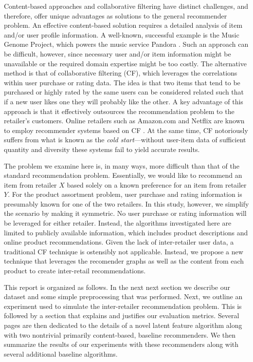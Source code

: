 \documentclass[11pt]{article}
\begin{document}
Content-based approaches and collaborative filtering have distinct challenges,
and therefore, offer unique advantages as solutions to the general recommender
problem.  An effective content-based solution requires a detailed analysis of
item and/or user profile information. A well-known, successful example is the
Music Genome Project, which powers the music service Pandora \cite{mgp}. Such an
approach can be difficult, however, since necessary user and/or item information
might be unavailable or the required domain expertise might be too costly. The
alternative method is that of collaborative filtering (CF), which leverages the
correlations within user purchase or rating data. The idea is that two items
that tend to be purchased or highly rated by the same users can be considered
related such that if a new user likes one they will probably like the other. A
key advantage of this approach is that it effectively outsources the
recommendation problem to the retailer's customers. Online retailers such as
Amazon.com and Netflix are known to employ recommender systems based on CF
\cite{Koren2009}. At the same time, CF notoriously suffers from what is known as
the {\em cold start}---without user-item data of sufficient quantity and
diversity these systems fail to yield accurate results.

The problem we examine here is, in many ways, more difficult than that of the
standard recommendation problem. Essentially, we would like to recommend an item
from retailer $X$ based solely on a known preference for an item from retailer
$Y$. For the product assortment problem, user purchase and rating information is
presumably known for one of the two retailers. In this study, however, we
simplify the scenario by making it symmetric. No user purchase or rating
information will be leveraged for either retailer. Instead, the algorithms
investigated here are limited to publicly available information, which includes
product descriptions and online product recommendations. Given the lack of
inter-retailer user data, a traditional CF technique is ostensibly not
applicable. Instead, we propose a new technique that leverages the recomender
graphs as well as the content from each product to create inter-retail
recommendations.

This report is organized as follows. In the next next section we describe our
dataset and some simple preprocessing that was performed. Next, we outline an
experiment used to simulate the inter-retailer recommendation problem. This is
followed by a section that explains and justifies our evaluation metrics.
Several pages are then dedicated to the details of a novel latent feature
algorithm along with two nontrivial primarily content-based, baseline
recommenders. We then summarize the results of our experiments with these
recommenders along with several additional baseline algorithms. 
\end{document}
